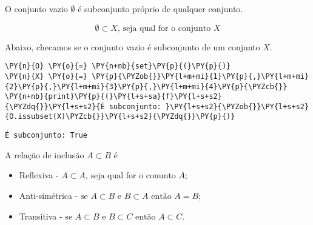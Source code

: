 \documentclass{book}
\begin{document}
        O conjunto vazio $\emptyset$ é subconjunto próprio de qualquer conjunto.

        $$\emptyset \subset X \text{, seja qual for o conjunto } X$$

        \begin{exemplo}
            Abaixo, checamos se o conjunto vazio é subconjunto de um conjunto $X$.



\begin{Verbatim}[commandchars=\\\{\},frame=single,fontsize=\small, xleftmargin=0.5em]
\PY{n}{O} \PY{o}{=} \PY{n+nb}{set}\PY{p}{(}\PY{p}{)}
\PY{n}{X} \PY{o}{=} \PY{p}{\PYZob{}}\PY{l+m+mi}{1}\PY{p}{,}\PY{l+m+mi}{2}\PY{p}{,}\PY{l+m+mi}{3}\PY{p}{,}\PY{l+m+mi}{4}\PY{p}{\PYZcb{}}
\PY{n+nb}{print}\PY{p}{(}\PY{l+s+sa}{f}\PY{l+s+s2}{\PYZdq{}}\PY{l+s+s2}{É subconjunto: }\PY{l+s+s2}{\PYZob{}}\PY{l+s+s2}{O.issubset(X)\PYZcb{}}\PY{l+s+s2}{\PYZdq{}}\PY{p}{)}
\end{Verbatim}

\begin{Verbatim}[commandchars=\\\{\},frame=leftline,fontsize=\small, xleftmargin=0.5em]
É subconjunto: True
\end{Verbatim}

        \end{exemplo}

        A relação de inclusão $A \subset B$ é

        \begin{itemize}
            \item Reflexiva - $A \subset A \text{, seja qual for o conunto } A$;
            \item Anti-simétrica - $\text{se }A \subset B \text{ e } B \subset A \text{ então } A = B$;
            \item Transitiva - $\text{se }A \subset B \text{ e } B \subset C \text{ então } A \subset C$.
        \end{itemize}
\end{document}
